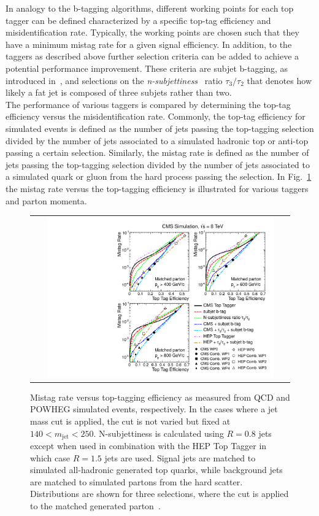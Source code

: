 In analogy to the b-tagging algorithms, different working points for each top tagger can be defined characterized by a specific top-tag efficiency and misidentification rate. Typically, the working points are chosen such that they have a minimum mistag rate for a given signal efficiency. In addition, to the taggers as described above further selection criteria can be added to achieve a potential performance improvement. These criteria are subjet b-tagging, as introduced in~\cite{CMS-PAS-BTV-13-001}, and selections on the \textit{n-subjettiness}~\cite{Thaler:2010tr, Thaler:2011gf} ratio $\tau_3/\tau_2$ that denotes how likely a fat jet is composed of three subjets rather than two. \\
The performance of various taggers is compared by determining the top-tag efficiency versus the misidentification rate. Commonly, the top-tag efficiency for simulated events is defined as the number of jets passing the top-tagging selection divided by the number of jets associated to a simulated hadronic top or anti-top passing a certain \pt selection. Similarly, the mistag rate is defined as the number of jets passing the top-tagging selection divided by the number of jets associated to a simulated quark or gluon from the hard process passing the \pt selection. In Fig.~\ref{fig:boosted_top_roc} the mistag rate versus the top-tagging efficiency is illustrated for various taggers and parton momenta.
\begin{figure}[!t] 
  \centering 
  \begin{tabular}{c}
    \includegraphics[width=0.9\textwidth]{figures/TopTag_ROC_Curves.pdf}  
  \end{tabular}
  \caption{Mistag rate versus top-tagging efficiency as measured from QCD  and POWHEG \ttbar simulated events, respectively. In the cases where a jet mass cut is applied, the cut is not varied but fixed at $140 < m_\mathrm{jet} < 250$\gev. N-subjettiness is calculated using $R = 0.8$ jets except when used in combination with the HEP Top Tagger in which case $R = 1.5$ jets are used. Signal jets are matched to simulated all-hadronic generated top quarks, while background jets are matched to simulated partons from the hard scatter. Distributions are shown for three \pt selections, where the \pt cut is applied to the matched generated parton~\cite{CMS:2014fya}.}
  \label{fig:boosted_top_roc}
\end{figure}
